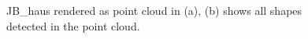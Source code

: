 \begin{figure}
\centering
{}
\caption{JB\_haus rendered as point cloud in (a), (b) shows all shapes detected in the point cloud. }
\label{fig:JB_haus_results}
\end{figure}

